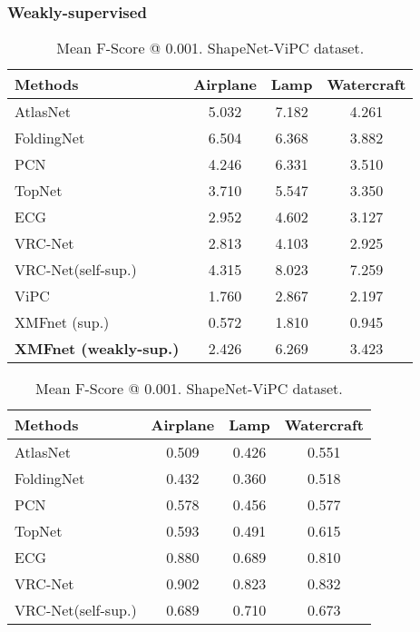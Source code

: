 \documentclass{article}
\begin{document}
\subsubsection{Weakly-supervised}

\begin{table}
\begin{minipage}{0.5\textwidth}
  \caption{Mean Chamfer Distance per point (). ShapeNet-ViPC dataset.}
  \setlength\tabcolsep{1.3pt}
  \label{self-res}
\begin{tabular}{lccc}
\cmidrule(r){1-4}
    Methods & Airplane & Lamp & Watercraft \\
    \midrule
    \midrule
    AtlasNet \cite{atlas} & 5.032 & 7.182 & 4.261     \\
    FoldingNet \cite{folding} & 6.504  & 6.368 & 3.882  \\
    PCN \cite{pcn} &  4.246 & 6.331 & 3.510 \\  
    TopNet \cite{topnet}  & 3.710 & 5.547 & 3.350  \\
    ECG \cite{ecg} & 2.952 & 4.602 & 3.127 \\ 
    VRC-Net \cite{vrc} & 2.813 & 4.103 & 2.925 \\
    VRC-Net(self-sup.) & 4.315 & 8.023 & 7.259 \\
    ViPC  \cite{vipc} &  1.760 & 2.867 & 2.197 \\
    XMFnet (sup.) & 0.572 & 1.810 & 0.945 \\
    \midrule
   \textbf{XMFnet (weakly-sup.)} & 2.426 & 6.269 & 3.423\\
    \bottomrule
  \end{tabular}
\vspace{0.3cm}
  \caption{Mean F-Score @ 0.001. ShapeNet-ViPC dataset.}
  \setlength\tabcolsep{1.3pt}
  \label{self-res-f}
\begin{tabular}{lccc}
\cmidrule(r){1-4}
    Methods & Airplane & Lamp & Watercraft \\
    \midrule
    \midrule
    AtlasNet \cite{atlas} & 0.509 & 0.426 & 0.551     \\
    FoldingNet \cite{folding} & 0.432  & 0.360 & 0.518  \\
    PCN \cite{pcn} &  0.578 & 0.456 & 0.577 \\  
    TopNet \cite{topnet}  & 0.593 & 0.491 & 0.615  \\
    ECG \cite{ecg} & 0.880 & 0.689 & 0.810 \\ 
    VRC-Net \cite{vrc} & 0.902 & 0.823 & 0.832 \\
    VRC-Net(self-sup.) & 0.689 & 0.710 & 0.673 \\

\end{tabular}
\end{minipage}
\end{table}
\end{document}
